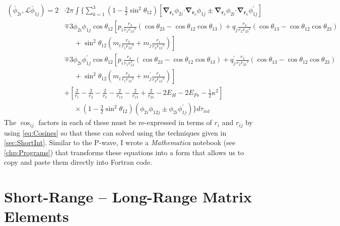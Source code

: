 \documentclass[Dissertation.tex]{subfiles}
\begin{document}
\begin{align}
\label{eq:DWavePhi2Phi1}
\left(\bar{\phi}_{2i},\mathcal{L} \bar{\phi}_{1j}\right) = 2 & \cdot 2\pi \int \Bigg\{ \sum_{k=1}^3 \left(1-\tfrac{3}{2}\sin^2\theta_{12}\right) \left[ \boldsymbol{\nabla}_{\!\mathbf{r}_k} \nonumber \phi_{2i} \boldsymbol{\cdot} \boldsymbol{\nabla}_{\!\mathbf{r}_k} \phi_{1j} \pm \boldsymbol{\nabla}_{\!\mathbf{r}_k} \phi_{2i} \boldsymbol{\cdot} \boldsymbol{\nabla}_{\!\mathbf{r}_k} \phi_{1j}^\prime \right] \\
 \nonumber &\mp 3 \phi_{2i} \phi_{1j} \cos\theta_{12} \left[p_i \frac{r_3}{r_1 {r_{13}}^2} (\cos\theta_{23} - \cos\theta_{12} \cos\theta_{13}) + q_j \frac{r_3}{r_2 {r_{23}}^2}(\cos\theta_{13} - \cos\theta_{12} \cos\theta_{23})\right.\\
 \nonumber & \left. \;\;\;\;\;  + \sin^2\theta_{12} \left(m_i \frac{r_2}{r_1 {r_{12}}^2} + m_j \frac{r_1}{r_2 {r_{12}}^2} \right) \right] \\
 \nonumber &\mp 3 \phi_{2i} \phi_{1j}^\prime \cos\theta_{12} \left[p_i \frac{r_3}{r_1 r_{13}^2} (\cos\theta_{23} - \cos\theta_{12} \cos\theta_{13}) + q_j^\prime \frac{r_3}{r_2 {r_{23}}^2}(\cos\theta_{13} - \cos\theta_{12} \cos\theta_{23})\right.\\
 \nonumber & \left. \;\;\;\;\;  + \sin^2\theta_{12} \left(m_i \frac{r_2}{r_1 {r_{12}}^2} + m_j^\prime \frac{r_1}{r_2 {r_{12}}^2} \right) \right] \\
 \nonumber &+ \left. \left[\frac{2}{r_1} - \frac{2}{r_2} - \frac{2}{r_3} - \frac{2}{r_{12}} - \frac{2}{r_{13}} + \frac{2}{r_{23}} - 2 E_H - 2 E_{Ps} - \frac{1}{2}\kappa^2 \right] \right. \\
 &\;\;\;\;\; \times \left(1-\tfrac{3}{2}\sin^2\theta_{12}\right) \left( \phi_{2i} \phi_{12j} \pm \phi_{2i} \phi_{1j}^\prime \right) \Bigg\} d\tau_{int}
\end{align}
The $\cos_{ij}$ factors in each of these must be re-expressed in terms of $r_i$
and $r_{ij}$ by using \cref{eq:Cosines} so that these can solved using the
techniques given in \cref{sec:ShortInt}. Similar to the P-wave, I wrote a
\emph{Mathematica} notebook (see \cref{chp:Programs}) that transforms
these equations into a form that allows us to copy and paste them directly
into Fortran code. 



\section{Short-Range -- Long-Range  Matrix Elements}
\label{sec:DWaveShortLong}
\end{document}
